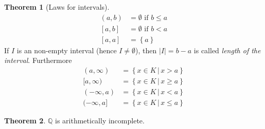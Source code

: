 \documentclass[a4paper,landscape,twocolumn]{article}
\theoremstyle{definition}
\newtheorem{theorem}{Theorem}
\newcommand\set[1]{\left\{#1\right\}}
\newcommand\setdef[2]{\left\{#1\,|\,#2\right\}}
\newcommand\abs[1]{\left|#1\right|}
\begin{document}

\begin{theorem}[Laws for intervals]
  \begin{align}
    (a, b) &= \emptyset \text{ if } b \leq a \\
    [a, b] &= \emptyset \text{ if } b < a \\
    [a, a] &= \set{a}
  \end{align}
  If $I$ is an non-empty interval (hence $I \neq \emptyset$),
  then $\abs{I} = b - a$ is called \emph{length of the interval}.
  Furthermore
  \begin{align}
    (a, \infty) &= \setdef{x \in K}{x > a} \\
    [a, \infty) &= \setdef{x \in K}{x \geq a} \\
    (-\infty, a) &= \setdef{x \in K}{x < a} \\
    (-\infty, a] &= \setdef{x \in K}{x \leq a}
  \end{align}
\end{theorem}

\begin{theorem}
  $\mathbb Q$ is arithmetically incomplete.
\end{theorem}
\end{document}
